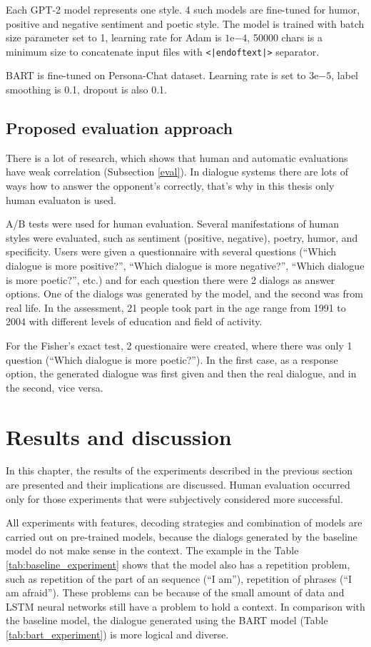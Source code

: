 Each GPT-2 model represents one style. 4 such models are fine-tuned for humor, positive and negative sentiment and poetic style. The model is trained with batch size parameter set to 1, learning rate for Adam is $1\mathrm{e}{-4}$, 50000 chars is a minimum size to concatenate input files with \texttt{<|endoftext|>} separator. 

BART is fine-tuned on Persona-Chat dataset. Learning rate is set to $3\mathrm{e}{-5}$, label smoothing is 0.1, dropout is also 0.1.

\section{Proposed evaluation approach}
There is a lot of research, which shows that human and automatic evaluations have weak correlation (Subsection \ref{eval}). In dialogue systems there are lots of ways how to answer the opponent's correctly, that's why in this thesis only human evaluaton is used. 

A/B tests were used for human evaluation. Several manifestations of human styles were evaluated, such as sentiment (positive, negative), poetry, humor, and specificity. Users were given a questionnaire with several questions (``Which dialogue is more positive?'', ``Which dialogue is more negative?'', ``Which dialogue is more poetic?'', etc.) and for each question there were 2 dialogs as answer options. One of the dialogs was generated by the model, and the second was from real life. In the assessment, 21 people took part in the age range from 1991 to 2004 with different levels of education and field of activity.

For the Fisher's exact test, 2 questionaire were created, where there was only 1 question (``Which dialogue is more poetic?''). In the first case, as a response option, the generated dialogue was first given and then the real dialogue, and in the second, vice versa.

\chapter{Results and discussion} \label{results_discuss}
In this chapter, the results of the experiments described in the previous section are presented and their implications are discussed. Human evaluation occurred only for those experiments that were subjectively considered more successful.

All experiments with features, decoding strategies and combination of models are carried out on pre-trained models, because the dialogs generated by the baseline model do not make sense in the context. The example in the Table \ref{tab:baseline_experiment} shows that the model also has a repetition problem, such as repetition of the part of an sequence (``I am''), repetition of phrases (``I am afraid''). These problems can be because of the small amount of data and LSTM neural networks still have a problem to hold a context. In comparison with the baseline model, the dialogue generated using the BART model (Table \ref{tab:bart_experiment}) is more logical and diverse.

